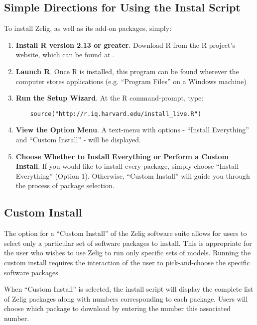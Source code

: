 \subsection{Simple Directions for Using the Instal Script}

To install Zelig, as well as its add-on packages, simply:

%
%
\begin{enumerate}

  \item {\bf Install R version 2.13 or greater}. Download R from the R project's
    website, which can be found at {\CranMirror}.

  \item {\bf Launch R}. Once R is installed, this program can be found wherever
    the computer stores applications (e.g. ``Program Files'' on a Windows machine)

  \item {\bf Run the Setup Wizard}. At the R command-prompt, type:
    \begin{verbatim}
    source("http://r.iq.harvard.edu/install_live.R")
    \end{verbatim}

  \item {\bf View the Option Menu}.
    A text-menu with options - ``Install Everything'' and ``Custom Install'' -
    will be displayed. 

  \item {\bf Choose Whether to Install Everything or Perform a Custom Install}.
    If you would like to install every package, simply choose
    ``Install Everything'' (Option 1). Otherwise, ``Custom Install'' will
    guide you through the process of package selection.

\end{enumerate}

\subsection{Custom Install}
\label{subsec:custominstall}

The option for a ``Custom Install'' of the Zelig software suite allows for
users to select only a particular set of software packages to install.
This is appropriate for the user who wishes to use Zelig to run only specific
sets of models. Running the custom install requires the interaction of the user
to pick-and-choose the specific software packages.

When ``Custom Install'' is selected, the install script will display the
complete list of Zelig packages along with numbers corresponding to each
package. Users will choose which package to download by entering the number this
associated number.

